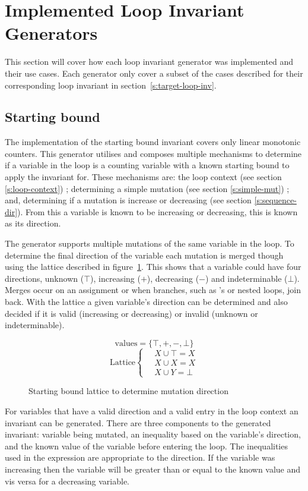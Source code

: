 \section{Implemented Loop Invariant Generators}

This section will cover how each loop invariant generator was implemented and their use cases.
Each generator only cover a subset of the cases described 
for their corresponding loop invariant in section~\ref{s:target-loop-inv}.

\subsection{Starting bound}

The implementation of the starting bound invariant covers only linear monotonic counters.
This generator utilises and composes multiple mechanisms to determine 
if a variable in the
loop is a counting variable with a known starting bound to apply the invariant for.
These mechanisms are: the loop context (see section \ref{s:loop-context}) ;
determining a simple mutation (see section \ref{s:simple-mut}) ; and,
determining if a mutation is increase or decreasing (see section \ref{s:sequence-dir}).
From this a variable is known to be increasing or decreasing, this is known as its direction.

The generator supports multiple mutations of the same variable in the loop.
To determine the final direction of the variable each mutation is merged though
using the lattice described in figure~\ref{eq:start-lattice}.
This shows that a variable could have four directions, unknown ($\top$),
increasing ($+$), decreasing ($-$) and indeterminable ($\bot$).
Merges occur on an assignment or when branches, 
such as 's or nested loops, join back.
With the lattice a given variable's direction can be determined and also
decided if it is valid (increasing or decreasing) or invalid (unknown or indeterminable).

\begin{figure}
$$\text{values} = \{ \top, +, -, \bot \}$$
\[
\text{Lattice} \begin{cases*}
\quad X \cup \top = X \\
\quad X \cup X = X \\
\quad X \cup Y = \bot
\end{cases*}
\]
\caption{Starting bound lattice to determine mutation direction}
\label{eq:start-lattice}
\end{figure}

For variables that have a valid direction and a valid entry in the loop context an invariant
can be generated.
There are three components to the generated invariant: variable being mutated, an inequality based
on the variable's direction, and the known value of the variable before entering the loop.
The inequalities used in the expression are appropriate to the direction. 
If the variable was increasing then the variable will be greater than or equal to the known value
and vis versa for a decreasing variable.

